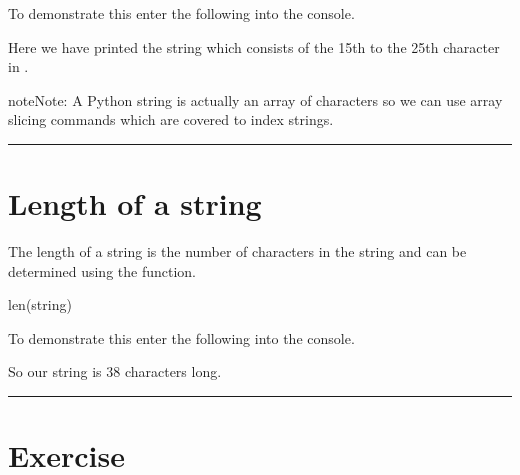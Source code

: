 \documentclass[letterpaper,10pt,english]{jupyterBook}
\begin{document}
\sphinxAtStartPar
To demonstrate this enter the following into the console.

\begin{sphinxVerbatim}[commandchars=\\\{\}]
 \PYG{p}{[}\PYG{p}{]} \PYG{p}{[}\PYG{p}{]}
 
\end{sphinxVerbatim}

\sphinxAtStartPar
Here we have printed the string which consists of the 15th to the 25th character in .

\begin{sphinxadmonition}{note}{Note:}
\sphinxAtStartPar
A Python string is actually an array of characters so we can use array slicing commands which are covered  to index strings.
\end{sphinxadmonition}


\bigskip\hrule\bigskip



\part{Length of a string}
\label{\detokenize{_pages/1.3_Strings:length-of-a-string}}
\sphinxAtStartPar
The length of a string is the number of characters in the string and can be determined using the  function.

\begin{sphinxVerbatim}[commandchars=\\\{\}]
len(string)
\end{sphinxVerbatim}

\sphinxAtStartPar
To demonstrate this enter the following into the console.

\begin{sphinxVerbatim}[commandchars=\\\{\}]
 \PYG{p}{[}\PYG{p}{]} 
\end{sphinxVerbatim}

\sphinxAtStartPar
So our string is 38 characters long.


\bigskip\hrule\bigskip



\part{Exercise}
\label{\detokenize{_pages/1.3_Strings:exercise}} \label{exercise:python-strings-ex}
\end{document}
